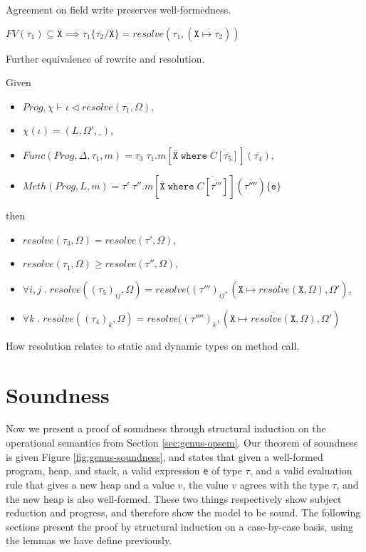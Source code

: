 Agreement on field write preserves well-formedness.

\begin{lemma} \label{lemma:9}
$FV(\tau_1) \subseteq \overline{\texttt{X}} \implies \tau_1\{\overline{\tau_2}/\overline{\texttt{X}}\} = resolve(\tau_1, (\overline{\texttt{X} \mapsto \tau_2}))$
\end{lemma}

Further equivalence of rewrite and resolution.

\begin{lemma} \label{lemma:10}
Given 
\begin{itemize}
    \item $Prog, \chi \vdash \iota \triangleleft resolve(\tau_1, \Omega)$,
    \item $\chi(\iota) = (L, \Omega', \_)$,
    \item $Func(Prog, \Delta, \tau_1, m) = \tau_3 \; \tau_1.m[\overline{\texttt{X}} \; \texttt{where} \; \overline{C[\overline{\tau_5}]}](\overline{\tau_4})$,
    \item $Meth(Prog, L, m) = \tau' \; \tau''.m[\overline{\texttt{X}} \; \texttt{where} \; \overline{C[\overline{\tau'''}]}](\overline{\tau''''})\{\texttt{e}\}$
\end{itemize}
then 
\begin{itemize}
    \item $resolve(\tau_3, \Omega) = resolve(\tau', \Omega)$,
    \item $resolve(\tau_1, \Omega) \geq resolve(\tau'', \Omega)$,
    \item $\forall i, j \; . \; resolve((\tau_5)_{ij}, \Omega) = resolve((\tau''')_{ij}, (\overline{\texttt{X} \mapsto resolve(\texttt{X}, \Omega)}, \Omega')$,
    \item $\forall k \; . \; resolve((\tau_4)_k, \Omega) = resolve((\tau'''')_k, (\overline{\texttt{X} \mapsto resolve(\texttt{X}, \Omega)}, \Omega')$
\end{itemize}
\end{lemma}

How resolution relates to static and dynamic types on method call.

\newpage

\section{Soundness} \label{sec:genus-sound}

Now we present a proof of soundness through structural induction on the operational semantics from Section \ref{sec:genus-opsem}. Our theorem of soundness is given Figure \ref{fig:genus-soundness}, and states that given a well-formed program, heap, and stack, a valid expression \texttt{e} of type $\tau$, and a valid evaluation rule that gives a new heap and a value $v$, the value $v$ agrees with the type $\tau$, and the new heap is also well-formed. These two things respectively show subject reduction and progress, and therefore show the model to be sound. The following sections present the proof by structural induction on a case-by-case basis, using the lemmas we have define previously.

